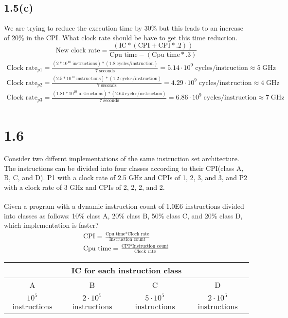 \documentclass[12pt]{article}
\begin{document}
\subsection*{1.5(c)}
We are trying to reduce the execution time by 30\% but this leads to an increase
of 20\% in the CPI.  What clock rate should be have to get this time reduction.
\begin{equation*}
	\text{New clock rate} = \frac{(\text{IC}*(\text{CPI}+\text{CPI}*.2))}{\text{Cpu time}-(\text{Cpu time}*.3)}
\end{equation*}
\begin{align*}
	\text{Clock rate}_{p1} = \frac{(2*10^{10}\;\text{instructions})*(1.8\;\text{cycles/instruction})}{7\;\text{seconds}} = 5.14\cdot10^{9}\;\text{cycles/instruction} \approx 5\;\text{GHz}\\
	\text{Clock rate}_{p2} = \frac{(2.5*10^{10}\;\text{instructions})*(1.2\;\text{cycles/instruction})}{7\;\text{seconds}} = 4.29\cdot10^{9}\;\text{cycles/instruction} \approx 4\;\text{GHz}\\
	\text{Clock rate}_{p3} = \frac{(1.81*10^{10}\;\text{instructions})*(2.64\;\text{cycles/instruction})}{7\;\text{seconds}} = 6.86\cdot10^{9}\;\text{cycles/instruction} \approx 7\;\text{GHz}\\
\end{align*}

\section*{1.6}
Consider two differnt implementations of the same instruction
set architecture.  The instructions can be divided into four classes according to their CPI(class A, B, C, and D).  P1 with a clock rate of 2.5 GHz and CPIs of 1, 2, 3, and 3, and P2 with a clock rate of 3 GHz and CPIs of 2, 2, 2, and 2.\\
\\
Given a program with a dynamic instruction count of 1.0E6 instructions divided
into classes as follows: 10\% class A, 20\% class B, 50\% class C, and 20\% class D,
which implementation is faster?
\begin{gather*}
	\text{CPI} = \frac{\text{Cpu time}*\text{Clock rate}}{\text{Instruction count}}\\
	\text{Cpu time} = \frac{\text{CPI}*{\text{Instruction count}}}{\text{Clock rate}}
\end{gather*}
\begin{center}
\begin{tabular}{|c|c|c|c|}
	\hline
	\multicolumn{4}{|c|}{IC for each instruction class}\\ 
	\hline
	A & B & C & D \\ \hline
	$10^5$ instructions & $2\cdot10^5$ instructions & $5\cdot10^5$ instructions & $2\cdot10^5$ instructions\\ 
	\hline
\end{tabular}
\end{center}
\end{document}
